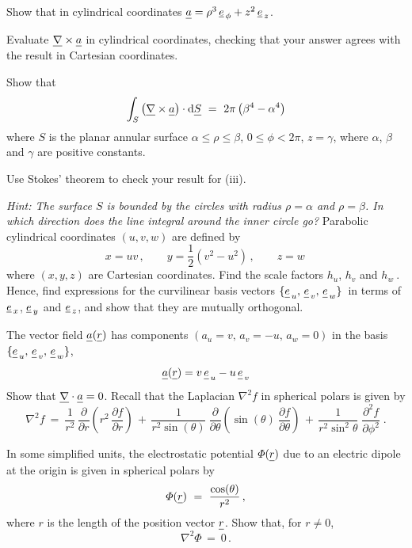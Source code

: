 \begin{ExerciseList}
  \Question Show that in cylindrical coordinates
  $\v{a} = \rho^3 \, \ephi + z^2 \, \ez$.

  \Question Evaluate $\curl \v{a}$ in cylindrical coordinates, checking that your
  answer agrees with the result in Cartesian coordinates.

  \Question Show that
  \[
    \int_S \left( \curl \v{a} \right) \cdot \mbox{d}\v{S}
    ~=~
    2\pi \left( \beta^4 - \alpha^4 \right)
  \]
  where $S$ is the planar annular surface $\alpha \le \rho \le \beta$, $0 \le \phi < 2\pi$,
  $z = \gamma$, where $\alpha$, $\beta$ and $\gamma$ are positive constants.

  \Question  Use Stokes' theorem to check your result for (iii).

  \emph{Hint: The surface $S$ is bounded by the circles with radius
    $\rho=\alpha$ and $\rho=\beta$. In which direction does the line
    integral around the inner circle go?}
  \Exercise Parabolic cylindrical coordinates $(u, v, w)$ are defined by
  \[
    x = uv \,, \qquad
    y = \frac{1}{2}(v^{2}-u^{2}) \,, \qquad
    z = w \,
  \]
  where $(x, y, z)$ are Cartesian coordinates. Find the scale factors $h_u$, $h_v$ and
  $h_w\:\!$. Hence, find expressions for the curvilinear basis vectors $\{\v{e}_{\,u}, \,
    \v{e}_{\,v}, \, \v{e}_{\,w}\}\,$ in terms of $\mbox{$\underline{\mbox{$e$}}_{{\,x}}$}$, $\mbox{$\underline{\mbox{$e$}}_{{\,y}}$}$ and $\mbox{$\underline{\mbox{$e$}}_{{\,z}}$}$, and show that they
  are mutually orthogonal.

  The vector field $\v{a}(\v{r})$ has components \( (a_{u}=v, \, a_{v}=-u, \, a_{w}=0) \)
  in the basis $\{\v{e}_{\,u}, \, \v{e}_{\,v}, \, \v{e}_{\,w}\}$,
  \[
    \v{a}(\v{r})
    =
    v  \, \v{e}_{\,u} - u \, \v{e}_{\,v}
  \]
  Show that $\Div \v{a} = 0$.
  \Exercise  Recall that the Laplacian $\nabla^2 f$ in spherical polars is given by
  \[
    \nabla^2 f
    ~ = ~
    \frac{1}{r^2}\,\frac{\partial}{\partial r}
    \left(r^2\, \frac{\partial f}{\partial r}\right)
    \,+\,
    \frac{1}{r^2\sin(\theta)} \:
    \frac{\partial}{\partial\theta}
    \left( \sin(\theta) \: \frac{\partial f}{\partial\theta}\right)
    \,+\,
    \frac{1}{r^2\sin^2\theta} \;
    \frac{\partial^2f}{\partial\phi^2} \;.
  \]

  In some simplified units, the electrostatic potential $\Phi(\v{r})$ due to an electric
  dipole at the origin is given in spherical polars by
  \[
    \Phi(\v{r})
    ~=~
    \frac{\cos(\theta)}{r^2} \, ,
  \]
  where $r$ is the length of the position vector $\v{r}$. Show that, for $r\ne 0$,
  \[
    \nabla^2 \Phi
    \,=~
    0 \, .
  \]


\end{ExerciseList}
